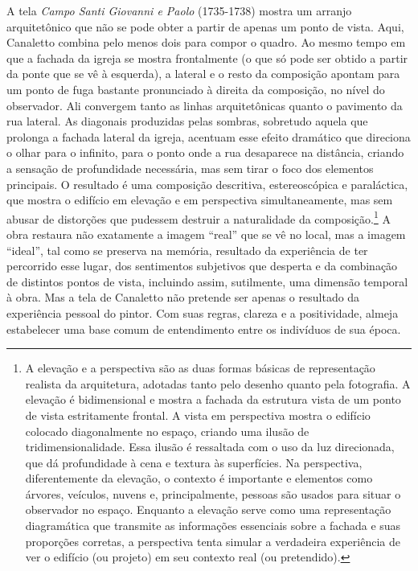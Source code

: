 A tela \emph{Campo Santi Giovanni e Paolo} (1735-1738) mostra um arranjo
arquitetônico que não se pode obter a partir de apenas um ponto de
vista. Aqui, Canaletto combina pelo menos dois para compor o quadro. Ao
mesmo tempo em que a fachada da igreja se mostra frontalmente (o que só
pode ser obtido a partir da ponte que se vê à esquerda), a lateral e o
resto da composição apontam para um ponto de fuga bastante pronunciado à
direita da composição, no nível do observador. Ali convergem tanto as
linhas arquitetônicas quanto o pavimento da rua lateral. As diagonais
produzidas pelas sombras, sobretudo aquela que prolonga a fachada
lateral da igreja, acentuam esse efeito dramático que direciona o olhar
para o infinito, para o ponto onde a rua desaparece na distância,
criando a sensação de profundidade necessária, mas sem tirar o foco dos
elementos principais. O resultado é uma composição descritiva,
estereoscópica e paraláctica, que mostra o edifício em elevação e em
perspectiva simultaneamente, mas sem abusar de distorções que pudessem
destruir a naturalidade da composição.\footnote{A elevação e a
  perspectiva são as duas formas básicas de representação realista da
  arquitetura, adotadas tanto pelo desenho quanto pela fotografia. A
  elevação é bidimensional e mostra a fachada da estrutura vista de um
  ponto de vista estritamente frontal. A vista em perspectiva mostra o
  edifício colocado diagonalmente no espaço, criando uma ilusão de
  tridimensionalidade. Essa ilusão é ressaltada com o uso da luz
  direcionada, que dá profundidade à cena e textura às superfícies. Na
  perspectiva, diferentemente da elevação, o contexto é importante e
  elementos como árvores, veículos, nuvens e, principalmente, pessoas
  são usados para situar o observador no espaço. Enquanto a elevação
  serve como uma representação diagramática que transmite as informações
  essenciais sobre a fachada e suas proporções corretas, a perspectiva
  tenta simular a verdadeira experiência de ver o edifício (ou projeto)
  em seu contexto real (ou pretendido).} A obra restaura não exatamente
a imagem ``real'' que se vê no local, mas a imagem ``ideal'', tal como
se preserva na memória, resultado da experiência de ter percorrido esse
lugar, dos sentimentos subjetivos que desperta e da combinação de
distintos pontos de vista, incluindo assim, sutilmente, uma dimensão
temporal à obra. Mas a tela de Canaletto não pretende ser apenas o
resultado da experiência pessoal do pintor. Com suas regras, clareza e a
positividade, almeja estabelecer uma base comum de entendimento entre os
indivíduos de sua época.

